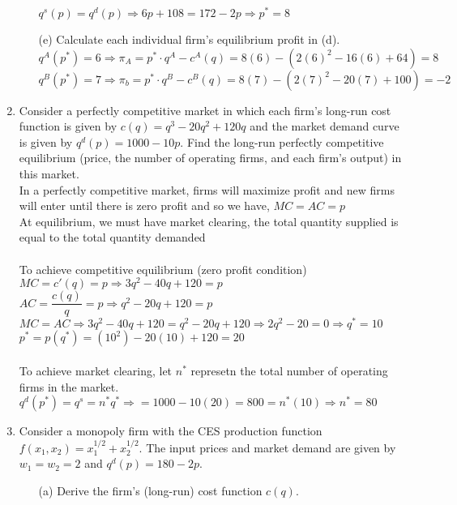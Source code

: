 \documentclass[11pt]{article}
\begin{document}
\begin{enumerate}
\begin{itemize}
	$q^s(p)=q^d(p)\Rightarrow6p+108=172-2p\Rightarrow p^*=8$\\
	\item[(e)] Calculate each individual firm's equilibrium profit in (d).
	\medskip\\
    $q^A(p^*)=6\Rightarrow\pi_A=p^*\cdot q^A-c^A(q)=8(6)-(2(6)^2-16(6)+64)=8$\\
    $q^B(p^*)=7\Rightarrow\pi_b=p^*\cdot q^B-c^B(q)=8(7)-(2(7)^2-20(7)+100)=-2$\\ 
	\end{itemize}
\pagebreak
\item Consider a perfectly competitive market in which each firm's long-run cost function is given by $c(q)=q^{3}-20q^{2}+120q$ and the market demand curve is given by $q^{d}(p)=1000-10p$. Find the long-run perfectly competitive equilibrium (price, the number of operating firms, and each firm's output) in this market.
    \medskip\\
    In a perfectly competitive market, firms will maximize profit and new firms will enter until there is zero profit and so we have, $MC=AC=p$\\
    At equilibrium, we must have market clearing, the total quantity supplied is equal to the total quantity demanded\\\\
    To achieve competitive equilibrium (zero profit condition)\\
    $MC=c'(q)=p\Rightarrow3q^2-40q+120=p$\\
    $AC=\dfrac{c(q)}{q}=p\Rightarrow q^2-20q+120=p$\\
    $MC=AC\Rightarrow 3q^2-40q+120=q^2-20q+120\Rightarrow 2q^2-20=0\Rightarrow q^*=10$\\
    $p^*=p(q^*)=(10^2)-20(10)+120=20$\\\\
    To achieve market clearing, let $n^*$ represetn the total number of operating firms in the market.\\
    $q^d(p^*)=q^s=n^*q^*\Rightarrow=1000-10(20)=800=n^*(10)\Rightarrow n^*=80$\\
\pagebreak
\item Consider a monopoly firm with the CES production function $f(x_{1},x_{2})=x_{1}^{1/2}+x_{2}^{1/2}$. The input prices and market demand are given by $w_{1}=w_{2}=2$ and $q^{d}(p)=180-2p$.
	\begin{itemize}
	\item[(a)] Derive the firm's (long-run) cost function $c(q)$.
    \medskip\\

\end{itemize}
\end{enumerate}
\end{document}
